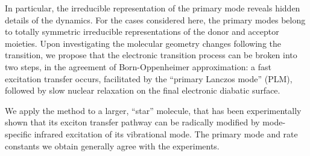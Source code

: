 In particular, the irreducible representation of the primary mode reveals
hidden details of the dynamics. For the cases considered here, the primary modes belong to totally symmetric irreducible representations  of
the donor and acceptor moieties. Upon investigating the molecular geometry changes following  the transition,   we propose that the electronic transition process can be
broken into two steps, in the agreement of Born-Oppenheimer approximation:  a fast excitation transfer occurs, facilitated by the ``primary Lanczos mode'' (PLM),
followed by slow nuclear relaxation on the final electronic diabatic surface.

We apply the method to a larger, ``star'' molecule, that has been experimentally shown  that its exciton transfer pathway can be radically modified by mode-specific infrared excitation of its vibrational mode. The primary mode and rate constants we obtain generally agree with the experiments.
\endgroup
\vfill
